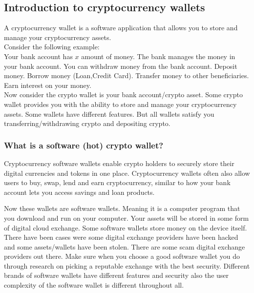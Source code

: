 \subsection{Introduction to cryptocurrency wallets}
A cryptocurrency wallet is a software application that allows you to store and manage your cryptocurrency assets. \\

Consider the following example: \\

Your bank account has $x$ amount of money. The bank manages the money in your bank account. You can withdraw money from the bank account. Deposit money. Borrow money (Loan,Credit Card). Transfer money to other beneficiaries. Earn interest on your money. \\

Now consider the crypto wallet is your bank account/crypto asset. Some crypto wallet provides you with the ability to store and manage your cryptocurrency assets. Some wallets have different features. But all wallets satisfy you transferring/withdrawing crypto and depositing crypto. \\

\subsubsection{What is a software (hot) crypto wallet?}
Cryptocurrency software wallets enable crypto holders to securely store their digital currencies and tokens in one place. Cryptocurrency wallets often also allow users to buy, swap, lend and earn cryptocurrency, similar to how your bank account lets you access savings and loan products.

Now these wallets are software wallets. Meaning it is a computer program that you download and run on your computer. Your assets will be stored in some form of digital cloud exchange. Some software wallets store money on the device itself. \\

There have been cases were some digital exchange providers have been hacked and some assets/wallets have been stolen. There are some scam digital exchange providers out there. Make sure when you choose a good software wallet you do through research on picking a reputable exchange with the best security. Different brands of software wallets have different features and security also the user complexity of the software wallet is different throughout all. \\

